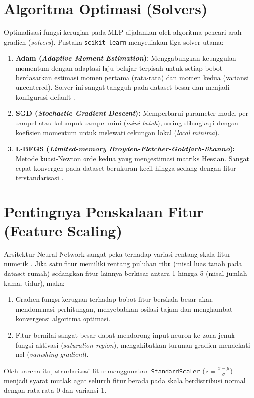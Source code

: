 \documentclass[a4paper,oneside,12pt]{report}
\begin{document}
\section{Algoritma Optimasi (Solvers)}
Optimalisasi fungsi kerugian pada MLP dijalankan oleh algoritma pencari arah gradien (\textit{solvers}). Pustaka \texttt{scikit-learn} menyediakan tiga solver utama:
\begin{enumerate}[noitemsep, topsep=2pt, parsep=1pt]
	\item \textbf{Adam (\textit{Adaptive Moment Estimation}):} Menggabungkan keunggulan momentum dengan adaptasi laju belajar terpisah untuk setiap bobot berdasarkan estimasi momen pertama (rata-rata) dan momen kedua (variansi uncentered). Solver ini sangat tangguh pada dataset besar dan menjadi konfigurasi default \cite{kingma2014}.
	\item \textbf{SGD (\textit{Stochastic Gradient Descent}):} Memperbarui parameter model per sampel atau kelompok sampel mini (\textit{mini-batch}), sering dilengkapi dengan koefisien momentum untuk melewati cekungan lokal (\textit{local minima}).
	\item \textbf{L-BFGS (\textit{Limited-memory Broyden-Fletcher-Goldfarb-Shanno}):} Metode kuasi-Newton orde kedua yang mengestimasi matriks Hessian. Sangat cepat konvergen pada dataset berukuran kecil hingga sedang dengan fitur terstandarisasi \cite{pedregosa2011}.
\end{enumerate}

\section{Pentingnya Penskalaan Fitur (Feature Scaling)}
Arsitektur Neural Network sangat peka terhadap variasi rentang skala fitur numerik \cite{haykin2009}. Jika satu fitur memiliki rentang puluhan ribu (misal luas tanah pada dataset rumah) sedangkan fitur lainnya berkisar antara 1 hingga 5 (misal jumlah kamar tidur), maka:
\begin{enumerate}[noitemsep, topsep=1pt, parsep=1pt]
	\item Gradien fungsi kerugian terhadap bobot fitur berskala besar akan mendominasi perhitungan, menyebabkan osilasi tajam dan menghambat konvergensi algoritma optimasi.
	\item Fitur bernilai sangat besar dapat mendorong input neuron ke zona jenuh fungsi aktivasi (\textit{saturation region}), mengakibatkan turunan gradien mendekati nol (\textit{vanishing gradient}).
\end{enumerate}
Oleh karena itu, standarisasi fitur menggunakan \texttt{StandardScaler} ($z = \frac{x - \mu}{\sigma}$) menjadi syarat mutlak agar seluruh fitur berada pada skala berdistribusi normal dengan rata-rata 0 dan variansi 1.
\end{document}
